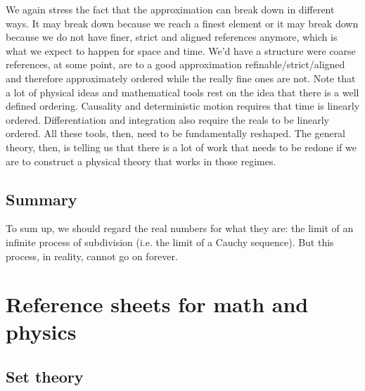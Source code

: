 \documentclass[11pt,letterpaper,fleqn]{memoir} %
\begin{document}
We again stress the fact that the approximation can break down in different ways. It may break down because we reach a finest element or it may break down because we do not have finer, strict and aligned references anymore, which is what we expect to happen for space and time. We'd have a structure were coarse references, at some point, are to a good approximation refinable/strict/aligned and therefore approximately ordered while the really fine ones are not. Note that a lot of physical ideas and mathematical tools rest on the idea that there is a well defined ordering. Causality and deterministic motion requires that time is linearly ordered. Differentiation and integration also require the reals to be linearly ordered. All these tools, then, need to be fundamentally reshaped. The general theory, then, is telling us that there is a lot of work that needs to be redone if we are to construct a physical theory that works in those regimes.


\section{Summary}

To sum up, we should regard the real numbers for what they are: the limit of an infinite process of subdivision (i.e. the limit of a Cauchy sequence). But this process, in reality, cannot go on forever.

\appendix

\chapter{Reference sheets for math and physics}

\section{Set theory}
\end{document}
